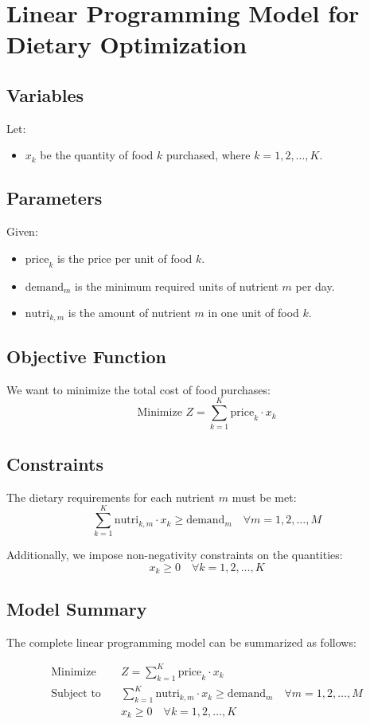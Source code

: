 \documentclass{article}
\begin{document}
\section*{Linear Programming Model for Dietary Optimization}

\subsection*{Variables}
Let:
\begin{itemize}
    \item \( x_k \) be the quantity of food \( k \) purchased, where \( k = 1, 2, \ldots, K \).
\end{itemize}

\subsection*{Parameters}
Given:
\begin{itemize}
    \item \( \text{price}_k \) is the price per unit of food \( k \).
    \item \( \text{demand}_m \) is the minimum required units of nutrient \( m \) per day.
    \item \( \text{nutri}_{k,m} \) is the amount of nutrient \( m \) in one unit of food \( k \).
\end{itemize}

\subsection*{Objective Function}
We want to minimize the total cost of food purchases:
\[
\text{Minimize } Z = \sum_{k=1}^{K} \text{price}_k \cdot x_k
\]

\subsection*{Constraints}
The dietary requirements for each nutrient \( m \) must be met:
\[
\sum_{k=1}^{K} \text{nutri}_{k,m} \cdot x_k \geq \text{demand}_m \quad \forall m = 1, 2, \ldots, M
\]

Additionally, we impose non-negativity constraints on the quantities:
\[
x_k \geq 0 \quad \forall k = 1, 2, \ldots, K
\]

\subsection*{Model Summary}
The complete linear programming model can be summarized as follows:

\begin{align*}
\text{Minimize} & \quad Z = \sum_{k=1}^{K} \text{price}_k \cdot x_k \\
\text{Subject to} & \quad \sum_{k=1}^{K} \text{nutri}_{k,m} \cdot x_k \geq \text{demand}_m \quad \forall m = 1, 2, \ldots, M \\
& \quad x_k \geq 0 \quad \forall k = 1, 2, \ldots, K
\end{align*}
\end{document}
